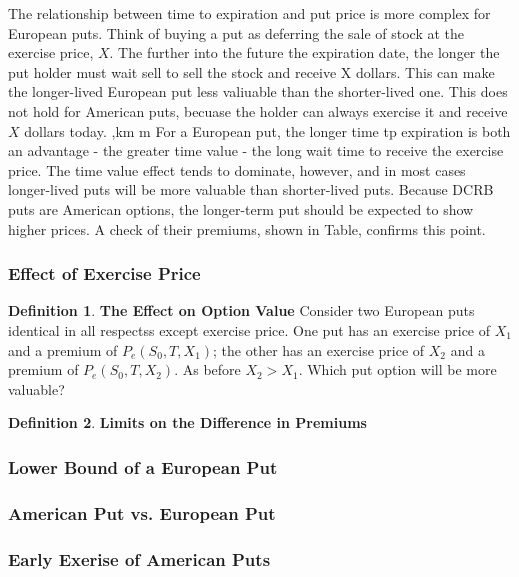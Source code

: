 \documentclass{book}
\theoremstyle{definition}
\newtheorem{definition}{Definition}[section]
\theoremstyle{remark}
\begin{document}
            The relationship between time to expiration and put price is more complex for European puts. Think of buying a put as deferring the sale of stock at the exercise price, $X$. The further into the future the expiration date, the longer the put holder must wait sell to sell the stock and receive X dollars. This can make the longer-lived European put less valiuable than the shorter-lived one. This does not hold for American puts, becuase the holder can always exercise it and receive $X$ dollars today. 
            ,km m
            For a European put, the longer time tp expiration is both an advantage - the greater time value - the long wait time to receive the exercise price. The time value effect tends to dominate, however, and in most cases longer-lived puts will be more valuable than shorter-lived puts. Because DCRB puts are American options, the longer-term put should be expected to show higher prices. A check of their premiums, shown in Table, confirms this point.
        \subsubsection{Effect of Exercise Price}
            
            \begin{definition}{\textbf{The Effect on Option Value}}
                Consider two European puts identical in all respectss except exercise price. One put has an exercise price of $X_1$ and a premium of $P_e(S_0, T, X_1)$; the other has an exercise price of $X_2$ and a premium of $P_e(S_0, T, X_2)$. As before $X_2 > X_1$. Which put option will be more valuable?     
            \end{definition}
            
            
            \begin{definition}{\textbf{Limits on the Difference in Premiums}}
            
            \end{definition}
        \subsubsection{Lower Bound of a European Put}
        \subsubsection{American Put vs. European Put}
        \subsubsection{Early Exerise of American Puts}
\end{document}
